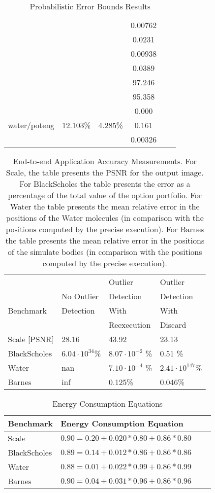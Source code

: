 \documentclass[11pt]{article}
\begin{document}
\begin {table}[t]
\begin{tabular}{c|ccccc}
	&  &  &  0.00762\\
	&  &  &  0.0231\\
	&  &  & 0.00938 \\
	&  &  &  0.0389\\
	&  &  &  97.246\\
	&  &  &  95.358\\
	
	\hline
	\multirow{3}{*}{water/poteng} & \multirow{3}{*}{12.103\%} & \multirow{3}{*}{4.285\%} & 0.000\\
	&  &  &  0.161\\
	&  &  & 0.00326\\
\end{tabular}
\caption{Probabilistic Error Bounds Results}
\label{tbl:probabilistic}
\end{table}


\begin{table}
\begin{tabular}{l|lll}
	          &            & Outlier & Outlier \\
	          & No Outlier & Detection & Detection \\
	Benchmark & Detection & With & With \\
	& & Reexecution & Discard \\
	\hline
	Scale [PSNR] & 28.16 & 43.92 & 23.13\\
	BlackScholes &$6.04\cdot 10^{34}$\% &  $8.07 \cdot 10^{-2}$ \% & 0.51 \%\\
	Water & nan & $7.10 \cdot 10^{-4}$ \% & $2.41 \cdot 10^{147}$\% \\
	Barnes & inf & 0.125\% & 0.046\%\\
\end{tabular}
\caption {End-to-end Application Accuracy Measurements. For Scale, the table presents
the PSNR for the output image. For BlackScholes the table presents the error
as a percentage of the total value of the option portfolio. For Water the table presents the 
mean relative error in the positions of the Water molecules (in comparison with
the positions computed by the precise execution). For Barnes the table presents the
mean relative error in the positions of the simulate bodies (in comparison with
the positions computed by the precise execution).}
\label{tbl:accuracy}
\end {table}

\begin{table}[h]
\centering
\footnotesize
\begin{tabular}{l|lll}
	Benchmark & Energy Consumption Equation  \\
	\hline
	Scale & $0.90 = 0.20 + 0.020*0.80 + 0.86*0.80 $ \\
        BlackScholes & $0.89 = 0.14 + 0.012*0.86 + 0.86*0.86 $ \\ 
        Water & $0.88 =  0.01 + 0.022*0.99 + 0.86*0.99 $ \\
        Barnes & $0.90 = 0.04 + 0.031*0.96 + 0.86*0.96$ \\
\end{tabular}
\caption{Energy Consumption Equations}
\label{tbl:energy}
\end {table}
\end{document}
